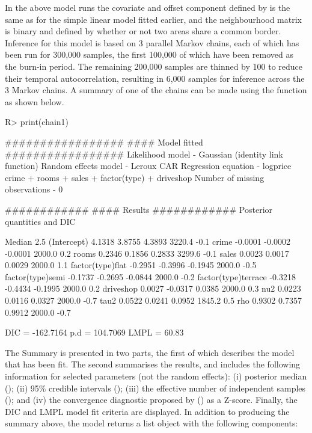 \documentclass[article,shortnames,nojss]{jss}
\begin{document}
In the above model runs the covariate and offset component defined by  is the same as for the simple linear model fitted earlier, and the neighbourhood matrix  is binary and defined by whether or not two areas share a common border. Inference for this model is based on 3 parallel Markov chains, each of which has been run for 300,000 samples, the first 100,000 of which have been removed as the burn-in period. The remaining 200,000 samples are thinned by 100 to reduce their temporal autocorrelation, resulting in 6,000 samples for inference across the 3 Markov chains. A summary of one of the chains can be made using the  function as shown below.

\begin{CodeInput}
R> print(chain1)
\end{CodeInput}

\begin{CodeOutput}
#################
#### Model fitted
#################
Likelihood model - Gaussian (identity link function) 
Random effects model - Leroux CAR
Regression equation - logprice ~ crime + rooms + sales + factor(type) + driveshop
Number of missing observations - 0

############
#### Results
############
Posterior quantities and DIC

                     Median    2.5%
(Intercept)          4.1318  3.8755  4.3893      3220.4        -0.1
crime               -0.0001 -0.0002 -0.0001      2000.0         0.2
rooms                0.2346  0.1856  0.2833      3299.6        -0.1
sales                0.0023  0.0017  0.0029      2000.0         1.1
factor(type)flat    -0.2951 -0.3996 -0.1945      2000.0        -0.5
factor(type)semi    -0.1737 -0.2695 -0.0844      2000.0        -0.2
factor(type)terrace -0.3218 -0.4434 -0.1995      2000.0         0.2
driveshop            0.0027 -0.0317  0.0385      2000.0         0.3
nu2                  0.0223  0.0116  0.0327      2000.0        -0.7
tau2                 0.0522  0.0241  0.0952      1845.2         0.5
rho                  0.9302  0.7357  0.9912      2000.0        -0.7

DIC =  -162.7164       p.d =  104.7069       LMPL =  60.83 
\end{CodeOutput}


The Summary is presented in two parts, the first of which describes the model that has been fit. The second summarises the results, and includes the following information for selected parameters (not the random effects): (i) posterior median (); (ii) 95\% credible intervals (); (iii) the effective number of independent samples (); and (iv) the convergence diagnostic proposed by \cite{geweke1992} () as a Z-score. Finally, the DIC and LMPL  model fit criteria are displayed. In addition to producing the summary above, the model returns a list object with the following components:
\end{document}
